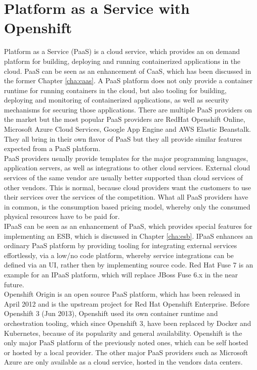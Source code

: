 \chapter{Platform as a Service with Openshift}
\label{cha:paas}
Platform as a Service (PaaS) is a cloud service, which provides an on demand platform for building, deploying and running containerized applications in the cloud. PaaS can be seen as an enhancement of CaaS, which has been discussed in the former Chapter \vref{cha:caas}. A PaaS platform does not only provide a container runtime for running containers in the cloud, but also tooling for building, deploying and monitoring of containerized applications, as well as security mechanisms for securing those applications. There are multiple PaaS providers on the market but the most popular PaaS providers are RedHat Openshift Online, Microsoft Azure Cloud Services, Google App Engine and AWS Elastic Beanstalk. They all bring in their own flavor of PaaS but they all provide similar features expected from a PaaS platform\cite{OpenshiftOnline2018, MicrosoftAzueCloudServices2018, GoogleCloudAE2018, AmazonWebServicesEBT2018}. \\

PaaS providers usually provide templates for the major programming languages, application servers, as well as integrations to other cloud services. External cloud services of the same vendor are usually better supported than cloud services of other vendors. This is normal, because cloud providers want the customers to use their services over the services of the competition. What all PaaS providers have in common, is the consumption based pricing model, whereby only the consumed physical resources have to be paid for. \\ 

IPaaS can be seen as an enhancement of PaaS, which provides special features for implementing an ESB, which is discussed in Chapter \vref{cha:esb}. IPaaS enhances an ordinary PaaS platform by providing tooling for integrating external services effortlessly, via a low/no code platform, whereby service integrations can be defined via an UI, rather then by implementing source code. Red Hat Fuse 7 is an example for an IPaaS platform, which will replace JBoss Fuse 6.x in the near future\cite{Fuse72018, iPaaSP12015, iPaaSP22015}. \\

Openshift Origin is an open source PaaS platform, which has been released in April 2012 and is the upstream project for Red Hat Openshift Enterprise. Before Openshift 3 (Jun 2013), Openshift used its own container runtime and orchestration tooling, which since Openshift 3, have been replaced by Docker and Kubernetes, because of its popularity and general availability. Openshift is the only major PaaS platform of the previously noted ones, which can be self hosted or hosted by a local provider. The other major PaaS providers such as Microsoft Azure are only available as a cloud service, hosted in the vendors data centers\cite{OpenshiftOriginGithub2018}.

